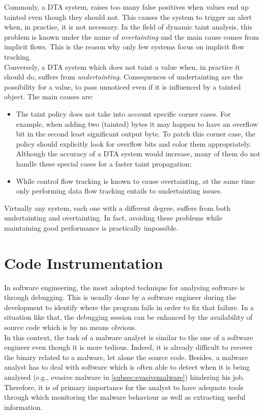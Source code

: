 \documentclass[LaM,binding=0.6cm]{sapthesis}
\begin{document}
Commonly, a DTA system, raises too many false positives when values end up tainted even though they should not. This causes the system to trigger an alert when, in practise, it is not necessary. In the field of dynamic taint analysis, this problem is known under the name of \textit{overtainting} and the main cause comes from implicit flows. This is the reason why only few systems focus on implicit flow tracking.\\
Conversely, a DTA system which does not taint a value when, in practice it should do, suffers from \textit{undertainting}. Consequences of undertainting are the possibility for a value, to pass unnoticed even if it is influenced by a tainted object. The main causes are:
\begin{itemize}
\item The taint policy does not take into account specific corner cases. For example, when adding two (tainted) bytes it may happen to have an overflow bit in the second least significant output byte. To patch this corner case, the policy should explicitly look for overflow bits and color them appropriately. Although the accuracy of a DTA system would increase, many of them do not handle these special cases for a faster taint propagation;
\item While control flow tracking is known to cause overtainting, at the same time only performing data flow tracking entails to undertainting issues.
\end{itemize}
Virtually any system, each one with a different degree, suffers from both undertainting and overtainting. In fact, avoiding these problems while maintaining good performance is practically impossible.
\newpage
\section{Code Instrumentation}
In software engineering, the most adopted technique for analysing software is through debugging. This is usually done by a software engineer during the development to identify where the program fails in order to fix that failure. In a situation like that, the debugging session can be enhanced by the availability of source code which is by no means obvious.\\
In this context, the task of a malware analyst is similar to the one of a software engineer even though it is more tedious. Indeed, it is already difficult to recover the binary related to a malware, let alone the source code. Besides, a malware analyst has to deal with software which is often able to detect when it is being analysed (e.g., evasive malware in \autoref{subsec:evasivemalware}) hindering his job. Therefore, it is of primary importance for the analyst to have adequate tools through which monitoring the malware behaviour as well as extracting useful information.\\ 
\end{document}
